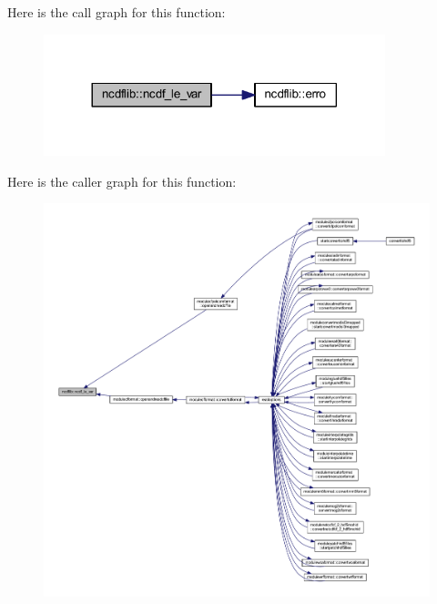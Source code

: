 Here is the call graph for this function\+:\nopagebreak
\begin{figure}[H]
\begin{center}
\leavevmode
\includegraphics[width=281pt]{namespacencdflib_ac0842e227620b638b2a5474d6e1b441f_cgraph}
\end{center}
\end{figure}
Here is the caller graph for this function\+:\nopagebreak
\begin{figure}[H]
\begin{center}
\leavevmode
\includegraphics[width=350pt]{namespacencdflib_ac0842e227620b638b2a5474d6e1b441f_icgraph}
\end{center}
\end{figure}
\mbox{\label{namespacencdflib_add9998fa9d635bb8d35f562f55be98a3}} 

